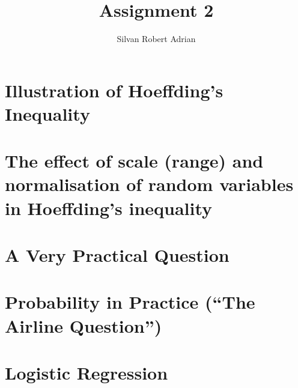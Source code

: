 \documentclass[a4paper]{article}
\title{\vspace{-5cm} Assignment 2}
\author{Silvan Robert Adrian}
\begin{document}
\maketitle

\tableofcontents

\section{Illustration of Hoeffding's Inequality}

\section{The effect of scale (range) and normalisation of random variables in
Hoeffding's inequality}


\section{A Very Practical Question}

\section{Probability in Practice (``The Airline Question'')}

\section{Logistic Regression}
\end{document}
